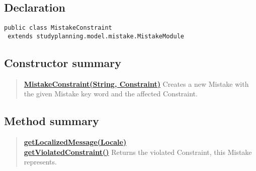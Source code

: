 \documentclass[11pt,a4paper]{report}
\begin{document}
{{{{{{{{{			\subsection{Declaration}{
				\begin{lstlisting}[frame=none]
public class MistakeConstraint
 extends studyplanning.model.mistake.MistakeModule
				\end{lstlisting}
			}
			
			\subsection{Constructor summary}{
				\begin{verse}
					\hyperlink{studyplanning.model.mistake.MistakeConstraint(java.lang.String, studyplanning.model.workflow.constraint.Constraint)}{{\bf MistakeConstraint(String, Constraint)}} Creates a new Mistake with the given Mistake key word and the affected Constraint.\\
				\end{verse}
			}
			
			\subsection{Method summary}{
				\begin{verse}
					\hyperlink{studyplanning.model.mistake.MistakeConstraint.getLocalizedMessage(studyplanning.view.Locale)}{{\bf getLocalizedMessage(Locale)}} \\
					\hyperlink{studyplanning.model.mistake.MistakeConstraint.getViolatedConstraint()}{{\bf getViolatedConstraint()}} Returns the violated Constraint, this Mistake represents.\\
				\end{verse}
			}
			
}}}}}}}}}
\end{document}
